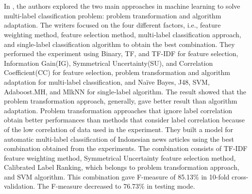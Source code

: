 \\\\
In \cite{Rahmawati2015}, the authors explored the two main approaches in machine learning to solve multi-label classification problem: problem transformation and algorithm adaptation. The writers focused on the four different factors, i.e., feature weighting method, feature selection method, multi-label classification approach, and single-label classification algorithm to obtain the best combination. They performed the experiment using Binary, TF, and TF-IDF for feature selection, Information Gain(IG), Symmetrical Uncertainty(SU), and Correlation Coefficient(CC) for feature selection, problem transformation and algorithm adaptation for multi-label classification, and Naïve Bayes, J48, SVM, Adaboost.MH, and MlkNN for single-label algorithm. The result showed that the problem transformation approach, generally, gave better result than algorithm adaptation. Problem transformation approaches that ignore label correlation obtain better performances than methods that consider label correlation because of the low correlation of data used in the experiment. They built a model for automatic multi-label classification of Indonesian news articles using the best combination obtained from the experiments. The combination consists of TF-IDF feature weighting method, Symmetrical Uncertainty feature selection method, Calibrated Label Ranking, which belongs to problem transformation approach, and SVM algorithm. This combination gave F-measure of 85.13\% in 10-fold cross-validation. The F-measure decreased to 76.73\% in testing mode.